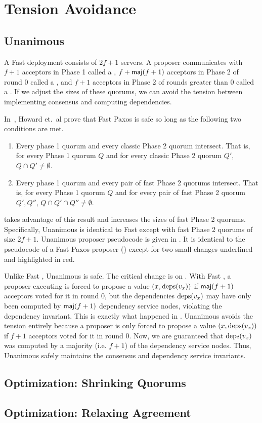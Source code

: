 \section{Tension Avoidance}

\subsection{Unanimous \BPaxos{}}
A Fast \BPaxos{} deployment consists of $2f+1$ servers. A proposer communicates
with $f+1$ acceptors in Phase 1 called a , $f +
\textsf{maj}(f+1)$ acceptors in Phase 2 of round $0$ called a , and $f + 1$ acceptors in Phase 2 of rounds greater than $0$ called a
. If we adjust the sizes of these quorums, we
can avoid the tension between implementing consensus and computing
dependencies.

In~\cite{howard2021fast}, Howard et.\ al prove that Fast Paxos is safe so long
as the following two conditions are met.
\begin{enumerate}
  \item
    Every phase 1 quorum and every classic Phase 2 quorum intersect. That is,
    for every Phase 1 quorum $Q$ and for every classic Phase 2 quorum $Q'$, $Q
    \cap Q' \neq \emptyset$.

  \item
    Every phase 1 quorum and every pair of fast Phase 2 quorums intersect. That
    is, for every Phase 1 quorum $Q$ and for every pair of fast Phase 2 quorum
    $Q', Q''$, $Q \cap Q' \cap Q'' \neq \emptyset$.
\end{enumerate}

{}

 takes advantage of this result and increases the
sizes of fast Phase 2 quorums. Specifically, Unanimous \BPaxos{} is identical
to Fast \BPaxos{} except with fast Phase 2 quorums of size $2f+1$. Unanimous
\BPaxos{} proposer pseudocode is given in . It
is identical to the pseudocode of a Fast Paxos proposer
() except for two small changes underlined and
highlighted in red.

Unlike Fast \BPaxos{}, Unanimous \BPaxos{} is safe. The critical change is on
. With Fast \BPaxos{}, a proposer executing
 is forced to propose a value $(x, \text{deps}(v_x))$ if
$\textsf{maj}(f+1)$ acceptors voted for it in round $0$, but the dependencies
$\text{deps}(v_x)$ may have only been computed by $\textsf{maj}(f+1)$ dependency service
nodes, violating the dependency invariant. This is exactly what happened in
. Unanimous \BPaxos{} avoids the tension entirely because
a proposer is only forced to propose a value $(x, \text{deps}(v_x))$ if $f+1$
acceptors voted for it in round $0$. Now, we are guaranteed that $\text{deps}(v_x)$
was computed by a majority (i.e. $f+1$) of the dependency service nodes. Thus,
Unanimous \BPaxos{} safely maintains the consensus and dependency service
invariants.

\subsection{Optimization: Shrinking Quorums}

\subsection{Optimization: Relaxing Agreement}
